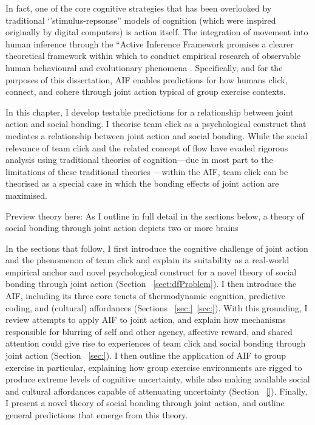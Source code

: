 \begin{CJK}{UTF8}{gbsn}
In fact, one of the core cognitive strategies that has been overlooked by traditional ‘’stimulus-repsonse” models of cognition (which were inspired originally by digital computers) is action itself.  The integration of movement into human inference through the “Active Inference Framework \citep[hereafter ‘’AIF’' cf.][]{Friston2010} promises a clearer theoretical framework within which to conduct empirical research of observable human behavioural and evolutionary phenomena \citep{Clark2015,Linson2018}.  Specifically, and for the purposes of this dissertation,  AIF enables predictions for how humans click, connect, and cohere through joint action typical of group exercise contexts.

In this chapter, I develop testable predictions for a relationship between joint action and social bonding.  I theorise team click as a psychological construct that mediates a relationship between joint action and social bonding.  While the social relevance of team click and the related concept of flow have evaded rigorous analysis using traditional theories of cognition—due in most part to the limitations of these traditional theories \cite{Dietrich2004,Slingerland2014}—within the AIF, team click can be theorised as a special case in which the bonding effects of joint action are maximised.

Preview theory here:
As I outline in full detail in the sections below, a theory of social bonding through joint action depicts two or more brains

In the sections that follow, I first introduce the cognitive challenge of joint action and the phenomenon of team click and explain its suitability as a real-world empirical anchor and novel psychological construct for a novel theory of social bonding through joint action (Section ~\ref{sect:dfProblem}).  I then introduce the AIF, including its three core tenets of thermodynamic cognition, predictive coding, and (cultural) affordances (Sections ~\ref{sec:}\nobreakdash~\ref{sec:}).  With this grounding, I review attempts to apply AIF to joint action, and explain how mechanisms responsible for blurring of self and other agency, affective reward, and shared attention could give rise to experiences of team click and social bonding through joint action (Section ~\ref{sec:}).  I then outline the application of AIF to group exercise in particular, explaining how group exercise environments are rigged to produce extreme levels of cognitive uncertainty, while also making available social and cultural affordances capable of attenuating uncertainty (Section ~\ref{}).  Finally, I present a novel theory of social bonding through joint action, and outline general predictions that emerge from this theory.



\end{CJK}
